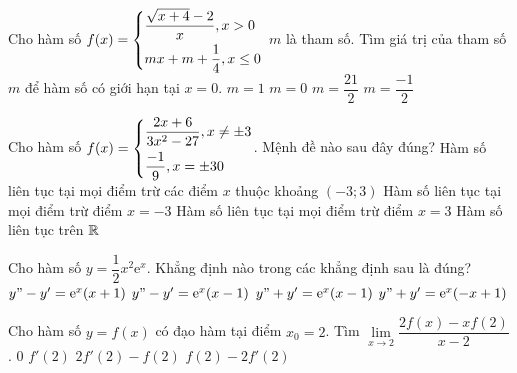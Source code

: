 \begin{ex}%
Cho hàm số $f(x)=\left\{\begin{aligned}&\dfrac{\sqrt{x+4}-2}{x}, x>0\\&mx+m+\dfrac{1}{4}, x \leq 0\end{aligned}\right.$ $m$ là tham số. Tìm giá trị của tham số $m$ để hàm số có giới hạn tại $x=0$.
\choice
{$m=1$}
{\True $m=0$}
{$m=\dfrac{21}{2}$}
{$m=\dfrac{-1}{2}$}
\end{ex}
\begin{ex}%
Cho hàm số $f(x)=\left\{\begin{aligned}&\dfrac{2x+6}{3x^2-27}, x \neq \pm 3\\&\dfrac{-1}{9}, x =\pm 3 0\end{aligned}\right.$. Mệnh đề nào sau đây đúng?
\choice
{Hàm số liên tục tại mọi điểm trừ các điểm $x$ thuộc khoảng $(-3;3)$}
{Hàm số liên tục tại mọi điểm trừ điểm $x=-3$}
{\True Hàm số liên tục tại mọi điểm trừ điểm $x=3$}
{Hàm số liên tục trên $\Bbb{R}$}
\end{ex}
\begin{ex}%
Cho hàm số $y=\dfrac{1}{2}x^2\mathrm{e}^x$. Khẳng định nào trong các khẳng định sau là đúng?
\choice
{\True $y"-y'=\mathrm{e}^x(x+1)$}
{$y"-y'=\mathrm{e}^x(x-1)$}
{$y"+y'=\mathrm{e}^x(x-1)$}
{$y"+y'=\mathrm{e}^x(-x+1)$}
\end{ex}
\begin{ex}%
Cho hàm số $y=f(x)$ có đạo hàm tại điểm $x_0 =2$. Tìm $\lim \limits_{x \to 2 } \dfrac{2f(x)-xf(2)}{x-2}$.
\choice
{$0$}
{$f'(2)$}
{\True $2f'(2)-f(2)$}
{$f(2)-2f'(2)$}
\end{ex}
